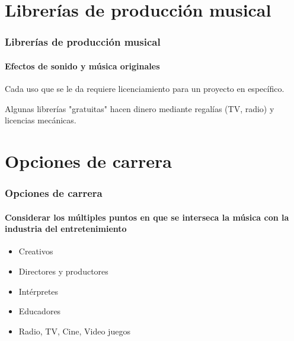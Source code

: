 \documentclass[xcolor=table]{beamer}
\begin{document}
	\section{Librerías de producción musical}
	\begin{frame}
		\frametitle{Librerías de producción musical}
		\framesubtitle{Efectos de sonido y música originales}
		\begin{tcolorbox}[colback=white,colframe=udlacolour,title=Cue]
    			Cada uso que se le da requiere licenciamiento para un proyecto en específico.
    		\end{tcolorbox}
		Algunas librerías "gratuitas" hacen dinero mediante regalías (TV, radio) y licencias mecánicas. 
	\end{frame}
	\section{Opciones de carrera}
	\begin{frame}
    		\frametitle{Opciones de carrera}
    		\framesubtitle{Considerar los múltiples puntos en que se interseca la música con la industria del entretenimiento}
		\begin{itemize}
			\item Creativos
			\item Directores y productores
			\item Intérpretes
			\item Educadores
			\item Radio, TV, Cine, Video juegos
		\end{itemize}
	\end{frame}
\end{document}
